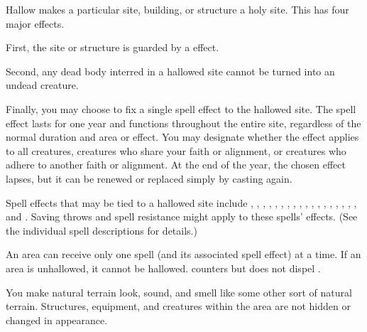 \begin{spelleffect}
Hallow makes a particular site, building, or structure a holy site. This has four major effects.
\par First, the site or structure is guarded by a  effect.
\par Second, any dead body interred in a hallowed site cannot be turned into an undead creature.
\par Finally, you may choose to fix a single spell effect to the hallowed site. The spell effect lasts for one year and functions throughout the entire site, regardless of the normal duration and area or effect. You may designate whether the effect applies to all creatures, creatures who share your faith or alignment, or creatures who adhere to another faith or alignment. At the end of the year, the chosen effect lapses, but it can be renewed or replaced simply by casting  again.
\par Spell effects that may be tied to a hallowed site include , , , , , , , , , , , , , , , , , , and . Saving throws and spell resistance might apply to these spells' effects. (See the individual spell descriptions for details.)
\end{spelleffect}
\begin{spellnotes}
\par An area can receive only one  spell (and its associated spell effect) at a time. If an area is unhallowed, it cannot be hallowed.  counters but does not dispel .
\end{spellnotes}

\spellrng{\rnglong}
\begin{spelleffect}
You make natural terrain look, sound, and smell like some other sort of natural terrain. Structures, equipment, and creatures within the area are not hidden or changed in appearance.
\end{spelleffect}

